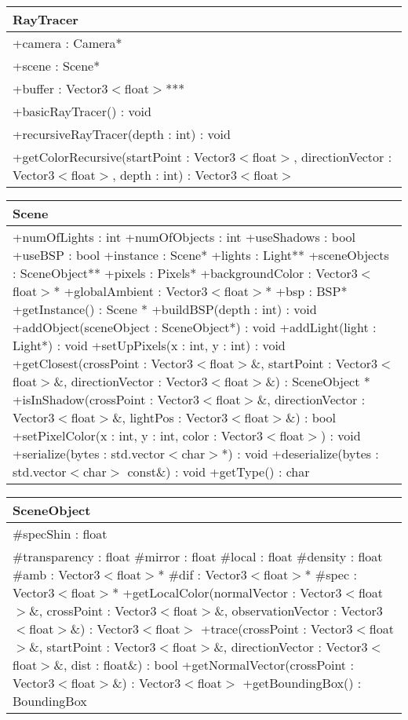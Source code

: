 \begin{center}
    \begin{tabular}{|l|}
    \hline
    RayTracer \\ \hline
    +camera : Camera* \\
    +scene : Scene* \\
    +buffer : Vector3$<$float$>$*** \\ \hline
	+basicRayTracer() : void \\
	+recursiveRayTracer(depth : int) : void \\
	+getColorRecursive(startPoint : Vector3$<$float$>$, directionVector : Vector3$<$float$>$, depth : int) : Vector3$<$float$>$ \hline
    \end{tabular}
\end{center}

\begin{center}
    \begin{tabular}{|l|}
    \hline
    Scene \\ \hline
    +numOfLights : int
    +numOfObjects : int
    +useShadows : bool
    +useBSP : bool
    +instance : Scene*
    +lights : Light**
    +sceneObjects : SceneObject**
    +pixels : Pixels*
    +backgroundColor : Vector3$<$float$>$*
    +globalAmbient : Vector3$<$float$>$*
    +bsp : BSP*
    \hline
	+getInstance() : Scene *
	+buildBSP(depth : int) : void
	+addObject(sceneObject : SceneObject*) : void
	+addLight(light : Light*) : void
	+setUpPixels(x : int, y : int) : void
	+getClosest(crossPoint : Vector3$<$float$>$\&, startPoint : Vector3$<$float$>$\&, directionVector : Vector3$<$float$>$\&) : SceneObject *
	+isInShadow(crossPoint : Vector3$<$float$>$\&, directionVector : Vector3$<$float$>$\&, lightPos : Vector3$<$float$>$\&) : bool
	+setPixelColor(x : int, y : int, color : Vector3$<$float$>$) : void
	+serialize(bytes : std.vector$<$char$>$*) : void
	+deserialize(bytes : std.vector$<$char$>$ const\&) : void
	+getType() : char
	\hline
    \end{tabular}
\end{center}

\begin{center}
    \begin{tabular}{|l|}
    \hline
    SceneObject \\ \hline
    #specShin : float \\
    #transparency : float
    #mirror : float
    #local : float
    #density : float
    #amb : Vector3$<$float$>$*
    #dif : Vector3$<$float$>$*
    #spec : Vector3$<$float$>$*
    \hline
	+getLocalColor(normalVector : Vector3$<$float$>$\&, crossPoint : Vector3$<$float$>$\&, observationVector : Vector3$<$float$>$\&) : Vector3$<$float$>$
	+trace(crossPoint : Vector3$<$float$>$\&, startPoint : Vector3$<$float$>$\&, directionVector : Vector3$<$float$>$\&, dist : float\&) : bool
	+getNormalVector(crossPoint : Vector3$<$float$>$\&) : Vector3$<$float$>$
	+getBoundingBox() : BoundingBox
	\hline
    \end{tabular}
\end{center}

